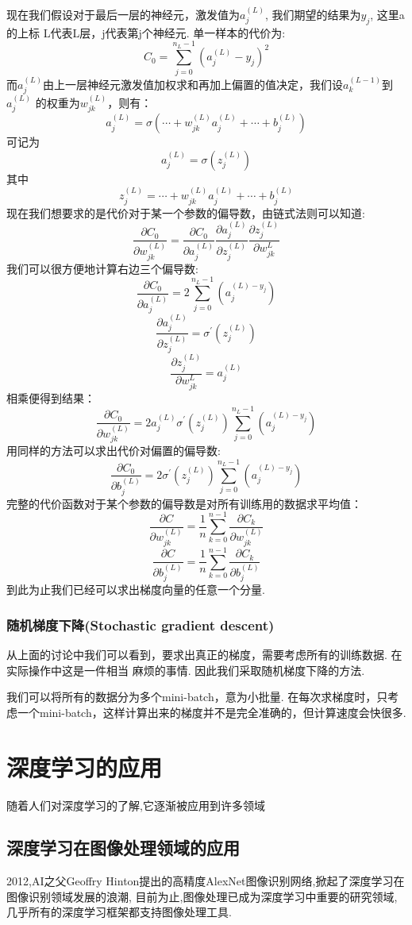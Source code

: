 \documentclass[UTF8]{ctexbook}
\begin{document}
现在我们假设对于最后一层的神经元，激发值为$a_j^{(L)}$, 我们期望的结果为$y_j$, 这里a的上标
L代表L层，j代表第j个神经元. 单一样本的代价为:
\[C_0=\sum_{j=0}^{n_L-1}\left(a_j^{(L)}-y_j\right)^2\]
而$a_j^{(L)}$由上一层神经元激发值加权求和再加上偏置的值决定，我们设$a_k^{(L-1)}$到$a_j^{(L)}$
的权重为$w_{jk}^{(L)}$，则有：
\[a_j^{(L)}=\sigma \left(\cdots +w_{jk}^{(L)}a_j^{(L)}+\cdots +b_j^{(L)}\right)\]
可记为
\[a_j^{(L)}=\sigma \left(z_j^{(L)}\right)\]
其中
\[z_j^{(L)}=\cdots +w_{jk}^{(L)}a_j^{(L)}+\cdots +b_j^{(L)}\]
现在我们想要求的是代价对于某一个参数的偏导数，由链式法则可以知道:
\[\frac{\partial C_0}{\partial w_{jk}^{(L)}}=\frac{\partial C_0}{\partial a_j^{(L)}}\frac{\partial a_j^{(L)}}{\partial z_j^{(L)}}\frac{\partial z_j^{(L)}}{\partial w_{jk}^{L}}\]
我们可以很方便地计算右边三个偏导数:
\[\frac{\partial C_0}{\partial a_j^{(L)}}=2\sum_{j=0}^{n_L-1}\left(a_j^{(L)-y_j}\right)\]
\[\frac{\partial a_j^{(L)}}{\partial z_j^{(L)}}=\sigma^{'}\left(z_j^{(L)}\right)\]
\[\frac{\partial z_j^{(L)}}{\partial w_{jk}^{L}}=a_j^{(L)}\]
相乘便得到结果：
\[\frac{\partial C_0}{\partial w_{jk}^{(L)}}=2a_j^{(L)}\sigma^{'}\left(z_j^{(L)}\right)\sum_{j=0}^{n_L-1}\left(a_j^{(L)-y_j}\right)\]
用同样的方法可以求出代价对偏置的偏导数:
\[\frac{\partial C_0}{\partial b_{j}^{(L)}}=2\sigma^{'}\left(z_j^{(L)}\right)\sum_{j=0}^{n_L-1}\left(a_j^{(L)-y_j}\right)\]
完整的代价函数对于某个参数的偏导数是对所有训练用的数据求平均值：
\[\frac{\partial C}{\partial w_{jk}^{(L)}}=\frac{1}{n}\sum_{k=0}^{n-1}\frac{\partial C_k}{\partial w_{jk}^{(L)}}\]
\[\frac{\partial C}{\partial b_{j}^{(L)}}=\frac{1}{n}\sum_{k=0}^{n-1}\frac{\partial C_k}{\partial b_{j}^{(L)}}\]
到此为止我们已经可以求出梯度向量的任意一个分量. 
\subsection{随机梯度下降(Stochastic gradient descent)}
从上面的讨论中我们可以看到，要求出真正的梯度，需要考虑所有的训练数据. 在实际操作中这是一件相当
麻烦的事情. 因此我们采取随机梯度下降的方法. 

我们可以将所有的数据分为多个mini-batch，意为小批量. 
在每次求梯度时，只考虑一个mini-batch，这样计算出来的梯度并不是完全准确的，但计算速度会快很多. 
\let\cleardoublepage\clearpage
\chapter{深度学习的应用}
随着人们对深度学习的了解,它逐渐被应用到许多领域
\section{深度学习在图像处理领域的应用}
2012,AI之父Geoffry Hinton提出的高精度AlexNet图像识别网络,掀起了深度学习在图像识别领域发展的浪潮,
目前为止,图像处理已成为深度学习中重要的研究领域,几乎所有的深度学习框架都支持图像处理工具.
\end{document}
